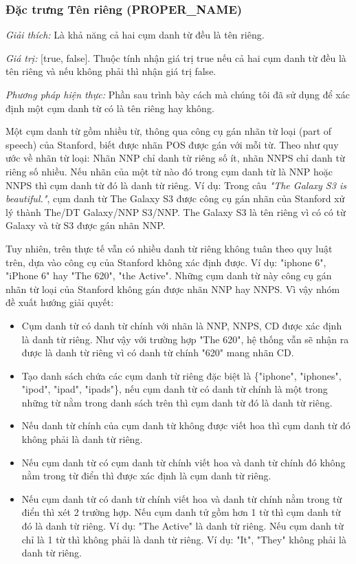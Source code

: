 \documentclass[12pt]{report}
\begin{document}
				\subsubsection*{Đặc trưng Tên riêng (PROPER\_NAME)}
					\par \textit{Giải thích:} Là khả năng cả hai cụm danh từ đều là tên riêng.
					\par \textit{Giá trị:} [true, false]. Thuộc tính nhận giá trị true nếu cả hai cụm danh từ đều là tên riêng và nếu không phải thì nhận giá trị false.
					\par \textit{Phương pháp hiện thực:} Phần sau trình bày cách mà chúng tôi đã sử dụng để xác định một cụm danh từ có là tên riêng hay không.				
					\par Một cụm danh từ gồm nhiều từ, thông qua công cụ gán nhãn từ loại (part of speech) của Stanford, biết được nhãn POS được gán với mỗi từ. Theo như quy ước về nhãn từ loại: Nhãn NNP chỉ danh từ riêng số ít, nhãn NNPS chỉ danh từ riêng số nhiều. Nếu nhãn của một từ nào đó trong cụm danh từ là NNP hoặc NNPS thì cụm danh từ đó là danh từ riêng. Ví dụ: Trong câu \textit{"The Galaxy S3 is beautiful."}, cụm danh từ The Galaxy S3 được công cụ gán nhãn của Stanford xử lý thành The/DT Galaxy/NNP S3/NNP. The Galaxy S3 là tên riêng vì có có từ Galaxy và từ S3 được gán nhãn NNP.
					\par Tuy nhiên, trên thực tế vẫn có nhiều danh từ riêng không tuân theo quy luật trên, dựa vào công cụ của Stanford không xác định được. Ví dụ: "iphone 6", "iPhone 6" hay "The 620", "the Active". Những cụm danh từ này công cụ gán nhãn từ loại của Stanford không gán được nhãn NNP hay NNPS. Vì vậy nhóm đề xuất hướng giải quyết:
					\begin{itemize}
						\item{Cụm danh từ có danh từ chính với nhãn là NNP, NNPS, CD được xác định là danh từ riêng. Như vậy với trường hợp "The 620", hệ thống vẫn sẽ nhận ra được là danh từ riêng vì có danh từ chính "620" mang nhãn CD.}
						\item{Tạo danh sách chứa các cụm danh từ riêng đặc biệt là \{"iphone", "iphones", "ipod", "ipad", "ipads"\}, nếu cụm danh từ có danh từ chính là một trong những từ nằm trong danh sách trên thì cụm danh từ đó là danh từ riêng.}
						\item{Nếu danh từ chính của cụm danh từ không được viết hoa thì cụm danh từ đó không phải là danh từ riêng.}
						\item{Nếu cụm danh từ có cụm danh từ chính viết hoa và danh từ chính đó không nằm trong từ điển thì được xác định là cụm danh từ riêng.}
						\item{Nếu cụm danh từ có danh từ chính viết hoa và danh từ chính nằm trong từ điển thì xét 2 trường hợp. Nếu cụm danh tử gồm hơn 1 từ thì cụm danh từ đó là danh từ riêng. Ví dụ: "The Active" là danh từ riêng. Nếu cụm danh từ chỉ là 1 từ thì không phải là danh từ riêng. Ví dụ: "It", "They" không phải là danh từ riêng.}
					\end{itemize}
\end{document}
